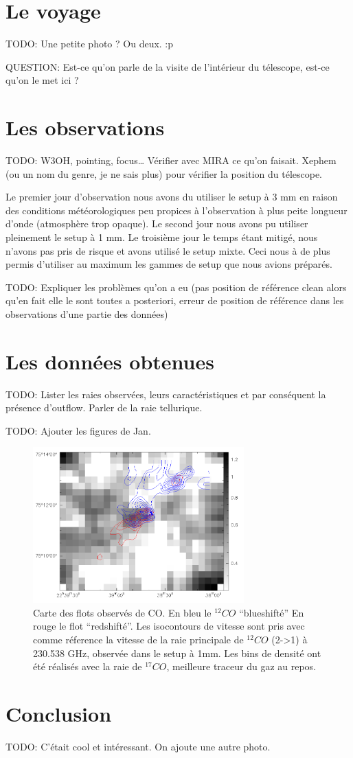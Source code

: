 \documentclass[a4paper,10pt,french]{article}
\begin{document}
\section{Le voyage}

TODO: Une petite photo ? Ou deux. :p

QUESTION: Est-ce qu’on parle de la visite de l’intérieur du télescope, est-ce
qu’on le met ici ?

\section{Les observations}

TODO: W3OH, pointing, focus… Vérifier avec MIRA ce qu’on faisait. Xephem (ou un
nom du genre, je ne sais plus) pour vérifier la position du télescope.

Le premier jour d'observation nous avons du utiliser le setup à 3 mm en raison des
conditions météorologiques peu propices à l'observation à plus peite longueur d'onde
(atmosphère trop opaque). Le second jour nous avons pu utiliser pleinement le setup à 1 mm.
Le troisième jour le temps étant mitigé, nous n'avons pas pris de risque et avons utilisé 
le setup mixte. Ceci nous à de plus permis d'utiliser au maximum les gammes de setup que
 nous avions préparés.

TODO: Expliquer les problèmes qu’on a eu (pas position de référence clean alors
qu’en fait elle le sont toutes a posteriori, erreur de position de référence
dans les observations d’une partie des données)

\section{Les données obtenues}

TODO: Lister les raies observées, leurs caractéristiques et par conséquent la
présence d’outflow. Parler de la raie tellurique.

TODO: Ajouter les figures de Jan.

\begin{figure}[h!]
\centering
\includegraphics[height=6cm]{figures/mapC17O.png}
\caption{Carte des flots observés de CO. En bleu le $^{12}CO$ ``blueshifté'' En rouge le flot ``redshifté''. Les isocontours de vitesse sont pris avec comme réference la vitesse de la raie principale de $^{12}CO$ (2->1) à 230.538 GHz, observée dans le setup à 1mm. Les bins de densité ont été réalisés avec la raie de $^{17}CO$, meilleure traceur du gaz au repos.}
\label{mapC17O}
\end{figure}

\section*{Conclusion}

TODO: C’était cool et intéressant. On ajoute une autre photo.
\end{document}
